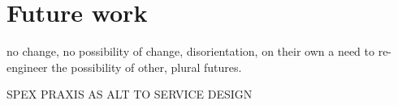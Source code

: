 


\section{Future work}



	no change, no possibility of change, disorientation, on their own
	a need to re-engineer the possibility of other, plural futures.

 SPEX PRAXIS AS ALT TO SERVICE DESIGN